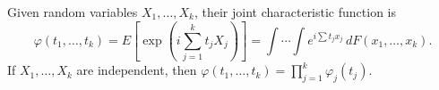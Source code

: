 Given random variables $X_1, \ldots, X_k$, their joint characteristic function is
$$\varphi(t_1, \ldots, t_k) = E\left[\exp\left(i \sum_{j=1}^{k} t_j X_j\right)\right] = \int \cdots \int e^{i \sum t_j x_j} \, dF(x_1, \ldots, x_k).$$
If $X_1, \ldots, X_k$ are independent, then $\varphi(t_1, \ldots, t_k) = \prod_{j=1}^{k} \varphi_j(t_j)$.
